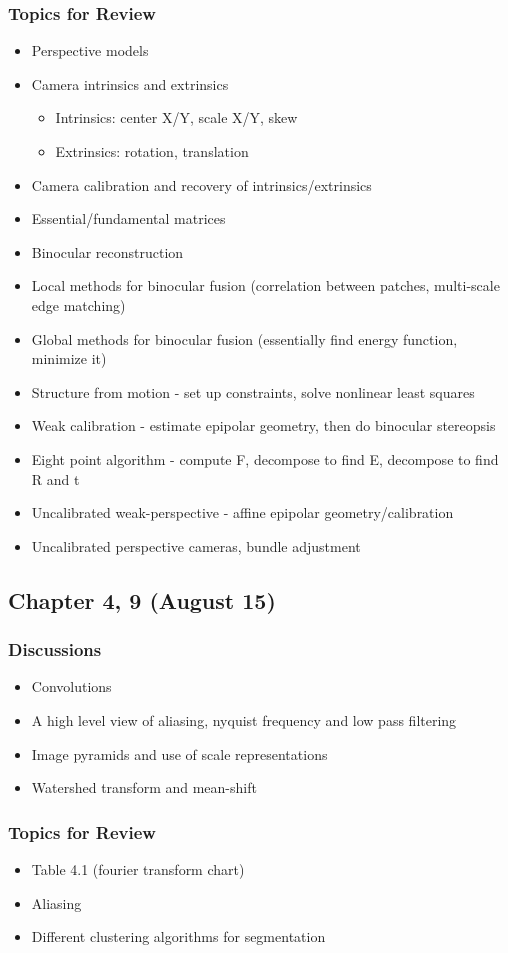 \subsubsection*{Topics for Review}
\begin{itemize}
\item Perspective models
\item Camera intrinsics and extrinsics
  \begin{itemize}
    \item Intrinsics: center X/Y, scale X/Y, skew
    \item Extrinsics: rotation, translation
  \end{itemize}
\item Camera calibration and recovery of intrinsics/extrinsics
\item Essential/fundamental matrices
\item Binocular reconstruction
\item Local methods for binocular fusion (correlation between patches, multi-scale edge matching)
\item Global methods for binocular fusion (essentially find energy function, minimize it)
\item Structure from motion - set up constraints, solve nonlinear least squares
\item Weak calibration - estimate epipolar geometry, then do binocular stereopsis
\item Eight point algorithm - compute F, decompose to find E, decompose to find R and t
\item Uncalibrated weak-perspective - affine epipolar geometry/calibration
\item Uncalibrated perspective cameras, bundle adjustment
\end{itemize}


\subsection{Chapter 4, 9 (August 15)}

\subsubsection*{Discussions}
\begin{itemize}
\item Convolutions
\item A high level view of aliasing, nyquist frequency and low pass filtering
\item Image pyramids and use of scale representations
\item Watershed transform and mean-shift
\end{itemize}

\subsubsection*{Topics for Review}
\begin{itemize}
\item Table 4.1 (fourier transform chart)
\item Aliasing
\item Different clustering algorithms for segmentation
\end{itemize}
